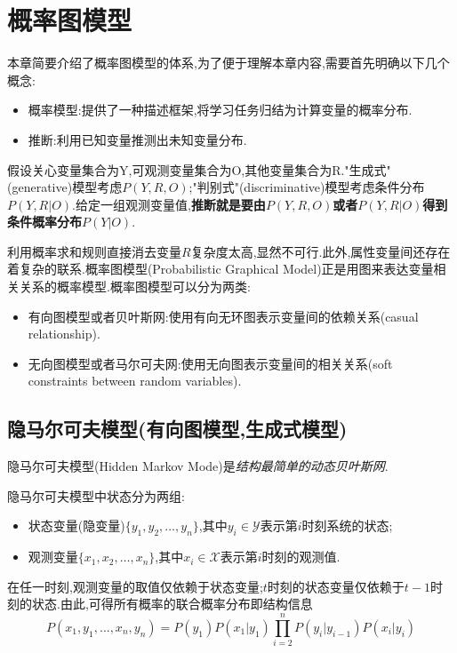 \chapter{概率图模型}

本章简要介绍了概率图模型的体系,为了便于理解本章内容,需要首先明确以下几个概念:
\begin{itemize}
\item 概率模型:提供了一种描述框架,将学习任务归结为计算变量的概率分布.
\item 推断:利用已知变量推测出未知变量分布.
\end{itemize}

假设关心变量集合为Y,可观测变量集合为O,其他变量集合为R."生成式"(generative)模型考虑$P(Y,R,O)$;"判别式"(discriminative)模型考虑条件分布$P(Y,R|O)$.给定一组观测变量值,\textbf{推断就是要由$P(Y,R,O)$或者$P(Y,R|O)$得到条件概率分布$P(Y|O)$}.

利用概率求和规则直接消去变量$R$复杂度太高,显然不可行.此外,属性变量间还存在着复杂的联系.概率图模型(Probabilistic Graphical Model)正是用图来表达变量相关关系的概率模型.概率图模型可以分为两类:
\begin{itemize}
\item 有向图模型或者贝叶斯网:使用有向无环图表示变量间的依赖关系(casual relationship).
\item 无向图模型或者马尔可夫网:使用无向图表示变量间的相关关系(soft constraints between random variables).
\end{itemize}

\section{隐马尔可夫模型(有向图模型,生成式模型)}

隐马尔可夫模型(Hidden Markov Mode)是\textit{结构最简单的动态贝叶斯网}.

隐马尔可夫模型中状态分为两组:
\begin{itemize}
\item 状态变量(隐变量)$\{y_1,y_2,\dots,y_n\}$,其中$y_i\in\mathcal Y$表示第$i$时刻系统的状态;
\item 观测变量$\{x_1,x_2,\dots,x_n\}$,其中$x_i\in\mathcal X$表示第$i$时刻的观测值.
\end{itemize}

在任一时刻,观测变量的取值仅依赖于状态变量;$t$时刻的状态变量仅依赖于$t-1$时刻的状态.由此,可得所有概率的联合概率分布即结构信息
\begin{equation}
P(x_1,y_1,\dots,x_n,y_n)=P(y_1)P(x_1|y_1)\prod_{i=2}^nP(y_i|y_{i-1})P(x_i|y_i)
\end{equation}

